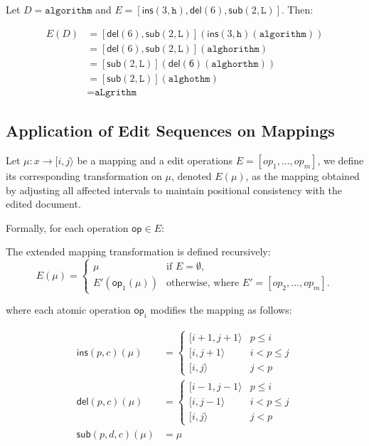 \documentclass{article}
\begin{document}
\begin{center}
	
	Let $D = \texttt{algorithm}$ and $E = [\mathsf{ins}(3,\texttt{h}), \mathsf{del}(6), \mathsf{sub}(2,\texttt{L})]$. Then:
	
	\begin{align*}
		E(D) &= [\mathsf{del}(6), \mathsf{sub}(2,\texttt{L})](\mathsf{ins}(3,\texttt{h})(\texttt{algorithm})) \\
		&= [\mathsf{del}(6), \mathsf{sub}(2,\texttt{L})](\texttt{alghorithm}) \\
		&= [\mathsf{sub}(2,\texttt{L})](\mathsf{del(6)}(\texttt{alghorthm})) \\
		&= [\mathsf{sub}(2,\texttt{L})](\texttt{alghothm})\\
		&= \texttt{aLgrithm} 
	\end{align*}
\end{center}


\subsection{Application of Edit Sequences on Mappings}

Let $\mu : x \to [i, j \rangle$ be a mapping and a edit operations $E = [op_1, \ldots, op_m]$, we define 
its corresponding transformation on $\mu$, denoted $E(\mu)$, as the mapping obtained by 
adjusting all affected intervals to maintain positional consistency with the edited document.

Formally, for each operation $\mathsf{op} \in E$:

The extended mapping transformation is defined recursively:
\[
E(\mu) =
\begin{cases}
	\mu & \text{if } E = \emptyset, \\[4pt]
	E'(\mathsf{op}_1(\mu)) & \text{otherwise, where } E' = [op_2, \ldots, op_m].
\end{cases}
\]

where each atomic operation $\mathsf{op}_i$ modifies the mapping as follows:

\begin{align*}
	\mathsf{ins}(p,c)(\mu) &= \begin{cases}
		[i + 1 , j+1 \rangle & p \leq i\\
		[i, j +1\rangle  & i < p \leq j\\
		[i, j \rangle   & j < p
	\end{cases}\\
	\mathsf{del}(p, c)(\mu) &= \begin{cases}
		[i - 1 , j-1 \rangle & p \leq i\\
		[i, j - 1\rangle  & i < p \leq j\\
		[i, j \rangle   & j < p
	\end{cases} \\
	\mathsf{sub}(p,d, c)(\mu) &= \mu
\end{align*}
\end{document}

